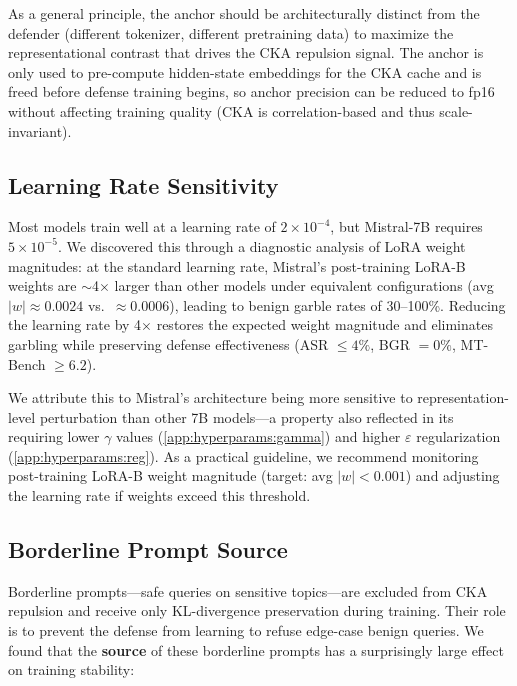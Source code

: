 \noindent As a general principle, the anchor should be architecturally distinct from the defender (different tokenizer, different pretraining data) to maximize the representational contrast that drives the CKA repulsion signal. The anchor is only used to pre-compute hidden-state embeddings for the CKA cache and is freed before defense training begins, so anchor precision can be reduced to fp16 without affecting training quality (CKA is correlation-based and thus scale-invariant).

\subsection{Learning Rate Sensitivity}
\label{app:hyperparams:lr}

Most models train well at a learning rate of $2 \times 10^{-4}$, but Mistral-7B requires $5 \times 10^{-5}$. We discovered this through a diagnostic analysis of LoRA weight magnitudes: at the standard learning rate, Mistral's post-training LoRA-B weights are $\sim$4$\times$ larger than other models under equivalent configurations (avg $|w| \approx 0.0024$ vs.\ $\approx 0.0006$), leading to benign garble rates of 30--100\%. Reducing the learning rate by 4$\times$ restores the expected weight magnitude and eliminates garbling while preserving defense effectiveness (ASR $\leq 4\%$, BGR $= 0\%$, MT-Bench $\geq 6.2$).

We attribute this to Mistral's architecture being more sensitive to representation-level perturbation than other 7B models---a property also reflected in its requiring lower $\gamma$ values (\cref{app:hyperparams:gamma}) and higher $\varepsilon$ regularization (\cref{app:hyperparams:reg}). As a practical guideline, we recommend monitoring post-training LoRA-B weight magnitude (target: avg $|w| < 0.001$) and adjusting the learning rate if weights exceed this threshold.

\subsection{Borderline Prompt Source}
\label{app:hyperparams:borderline}

Borderline prompts---safe queries on sensitive topics---are excluded from CKA repulsion and receive only KL-divergence preservation during training. Their role is to prevent the defense from learning to refuse edge-case benign queries. We found that the \textbf{source} of these borderline prompts has a surprisingly large effect on training stability:

